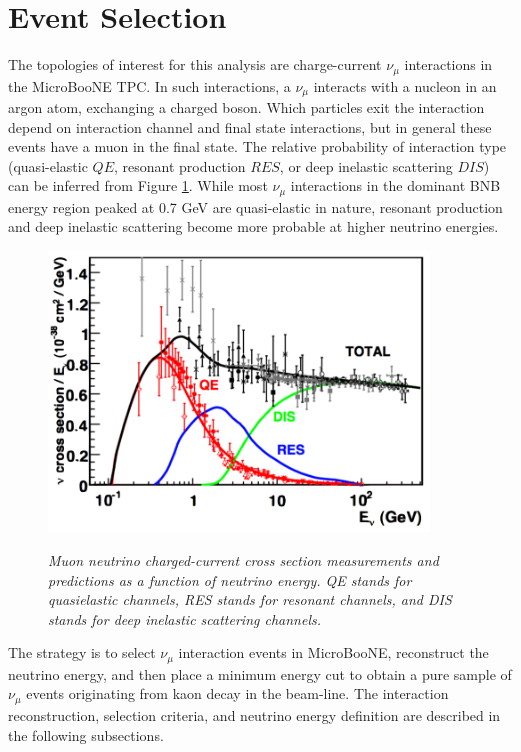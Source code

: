 \section{Event Selection}
The topologies of interest for this analysis are charge-current $\nu_\mu$ interactions in the MicroBooNE TPC. In such interactions, a $\nu_\mu$ interacts with a nucleon in an argon atom, exchanging a charged boson. Which particles exit the interaction depend on interaction channel and final state interactions, but in general these events have a muon in the final state. The relative probability of interaction type (quasi-elastic $QE$, resonant production $RES$, or deep inelastic scattering $DIS$) can be inferred from Figure \ref{bnb_xsec_breakdown_fig}. While most $\nu_\mu$ interactions in the dominant BNB energy region peaked at 0.7 GeV are quasi-elastic in nature, resonant production and deep inelastic scattering become more probable at higher neutrino energies.\\

\begin{figure}[ht!]
\centering
	\includegraphics[width=0.9\textwidth]{Figures/numu_xsec_breakdown.png} \\
\caption{\textit{Muon neutrino charged-current cross section measurements and predictions as a function of neutrino energy. QE stands for quasielastic channels, RES stands for resonant channels, and DIS stands for deep inelastic scattering channels.}}\label{bnb_xsec_breakdown_fig}
\end{figure}

The strategy is to select $\nu_\mu$ interaction events in MicroBooNE, reconstruct the neutrino energy, and then place a minimum energy cut to obtain a pure sample of $\nu_\mu$ events originating from kaon decay in the beam-line. The interaction reconstruction, selection criteria, and neutrino energy definition are described in the following subsections.


